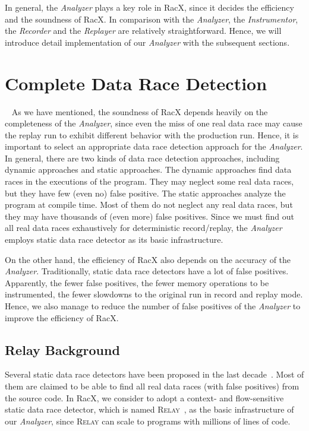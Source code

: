 \documentclass[10pt,onecolumn,letterpaper]{article}
\begin{document}
In general, the \emph{Analyzer} plays a key role in RacX, since it
decides the efficiency and the soundness of RacX. In comparison with
the \emph{Analyzer}, the \emph{Instrumentor}, the \emph{Recorder}
and the \emph{Replayer} are relatively straightforward. Hence, we
will introduce detail implementation of our \emph{Analyzer} with the
subsequent sections.

\section{Complete Data Race Detection}~\label{sec:race}
As we have mentioned, the soundness of RacX depends heavily on the
completeness of the \emph{Analyzer}, since even the miss of one real
data race may cause the replay run to exhibit different behavior
with the production run. Hence, it is important to select an
appropriate data race detection approach for the \emph{Analyzer}. In
general, there are two kinds of data race detection approaches,
including dynamic approaches and static approaches. The dynamic
approaches find data races in the executions of the program. They
may neglect some real data races, but they have few (even no) false
positive. The static approaches analyze the program at compile time.
Most of them do not neglect any real data races, but they may have
thousands of (even more) false positives. Since we must find out all
real data races exhaustively for deterministic record/replay, the
\emph{Analyzer} employs static data race detector as its basic
infrastructure.

On the other hand, the efficiency of RacX also depends on the
accuracy of the \emph{Analyzer}. Traditionally, static data race
detectors have a lot of false positives. Apparently, the fewer false
positives, the fewer memory operations to be instrumented, the fewer
slowdowns to the original run in record and replay mode. Hence, we
also manage to reduce the number of false positives of the
\emph{Analyzer} to improve the efficiency of RacX.

\subsection{Relay Background}
Several static data race detectors have been proposed in the last
decade~\cite{Flanagan00PLDI,Boyapati02OOSPLA,Engler03SOSP,Pratikakis06PLDI,Naik06PLDI,Voung07FSE}.
Most of them are claimed to be able to find all real data races
(with false positives) from the source code. In RacX, we consider to
adopt a context- and flow-sensitive static data race detector, which
is named R\textsc{elay}~\cite{Voung07FSE}, as the basic
infrastructure of our \emph{Analyzer}, since R\textsc{elay} can
scale to programs with millions of lines of code.
\end{document}
